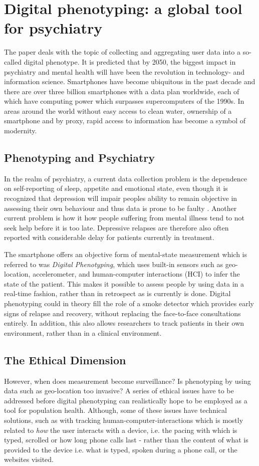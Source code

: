 \section{Digital phenotyping: a global tool for psychiatry}
The paper \cite{digital_phenotyping} deals with the topic of collecting and aggregating user data into a so-called digital phenotype. It is predicted that by 2050, the biggest impact in psychiatry and mental health will have been the revolution in technology- and information science. Smartphones have become ubiquitous in the past decade and there are over three billion smartphones with a data plan worldwide, each of which have computing power which surpasses supercomputers of the 1990s. In areas around the world without easy access to clean water, ownership of a smartphone and by proxy, rapid access to information has become a symbol of modernity. 

\subsection{Phenotyping and Psychiatry}
In the realm of psychiatry, a current data collection problem is the dependence on self-reporting of sleep, appetite and emotional state, even though it is recognized that depression will impair peoples ability to remain objective in assessing their own behaviour and thus data is prone to be faulty \cite{digital_phenotyping}. Another current problem is how it how people suffering from mental illness tend to not seek help before it is too late. Depressive relapses are therefore also often reported with considerable delay for patients currently in treatment. 

The smartphone offers an objective form of mental-state measurement which is referred to was \textit{Digital Phenotyping}, which uses built-in sensors such as geo-location, accelerometer, and human-computer interactions (HCI) to infer the state of the patient. This makes it possible to assess people by using data in a real-time fashion, rather than in retrospect as is currently is done. Digital phenotyping could in theory fill the role of a smoke detector which provides early signs of relapse and recovery, without replacing the face-to-face consultations entirely. In addition, this also allows researchers to track patients in their own environment, rather than in a clinical environment.

\subsection{The Ethical Dimension}
However, when does measurement become surveillance? Is phenotyping by using data such as geo-location too invasive? A series of ethical issues have to be addressed before digital phenotyping can realistically hope to be employed as a tool for population health. Although, some of these issues have technical solutions, such as with tracking human-computer-interactions which is mostly related to \textit{how} the user interacts with a device, i.e. the pacing with which is typed, scrolled or how long phone calls last - rather than the content of what is provided to the device i.e. what is typed, spoken during a phone call, or the websites visited. 
